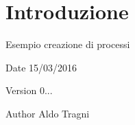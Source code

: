 \hypertarget{index_intro}{}\section{Introduzione}\label{index_intro}
Esempio creazione di processi ~\newline
 \begin{DoxyDate}{Date}
15/03/2016 
\end{DoxyDate}
\begin{DoxyVersion}{Version}
0... 
\end{DoxyVersion}
\begin{DoxyAuthor}{Author}
Aldo Tragni 
\end{DoxyAuthor}
